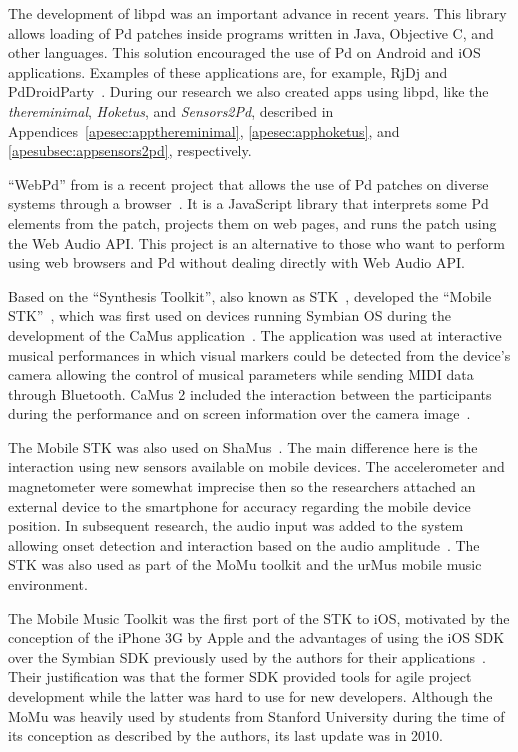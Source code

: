 The development of libpd was an important advance in recent years.
This library allows loading of Pd patches inside programs written in Java, Objective C, and other languages.
This solution encouraged the use of Pd on Android and iOS applications.
Examples of these applications are, for example, RjDj and PdDroidParty~\citep{Brinkmann2011embeddingpd,Brinkmann2012makingmusicalapps}.
During our research we also created apps using libpd, like the \textit{thereminimal}, \textit{Hoketus}, and \textit{Sensors2Pd}, described in Appendices~\ref{apesec:appthereminimal}, \ref{apesec:apphoketus}, and \ref{apesubsec:appsensors2pd}, respectively.

``WebPd'' from \citeauthor{Piquemal2017webpd} is a recent project that allows the use of Pd patches on diverse systems through a browser~\citep{Piquemal2017webpd}.
It is a JavaScript library that interprets some Pd elements from the patch, projects them on web pages, and runs the patch using the Web Audio API.
This project is an alternative to those who want to perform using web browsers and Pd without dealing directly with Web Audio API.

Based on the ``Synthesis Toolkit'', also known as STK~\citep{Cook1999stk}, \citeauthor{Essl2006mobilestk} developed the ``Mobile STK''~\citep{Essl2006mobilestk}, which was first used on devices running  Symbian OS during the development of the CaMus application~\citep{Rohs2006camus}.
The application was used at interactive musical performances in which visual markers could be detected from the device's camera allowing the control of musical parameters while sending MIDI data through Bluetooth.
CaMus 2 included the interaction between the participants during the performance and on screen information over the camera image~\citep{Rohs2007camus2}.

The Mobile STK was also used on ShaMus~\citep{Essl2007shamus}.
The main difference here is the interaction using new sensors available on mobile devices.
The accelerometer and magnetometer were somewhat imprecise then so the researchers attached an external device to the smartphone for accuracy regarding the mobile device position.
In subsequent research, the audio input was added to the system allowing onset detection and interaction based on the audio amplitude~\citep{Misra2008microphone}. 
The STK was also used as part of the MoMu toolkit and the urMus mobile music environment. 

The Mobile Music Toolkit was the first port of the STK to iOS, motivated by the conception of the iPhone 3G by Apple and the advantages of using the iOS SDK over the Symbian SDK previously used by the authors for their applications~\citep{Bryan2010momu}.
Their justification was that the former SDK provided tools for agile project development while the latter was hard to use for new developers.
Although the MoMu was heavily used by students from Stanford University during the time of its conception as described by the authors, its last update was in 2010.

